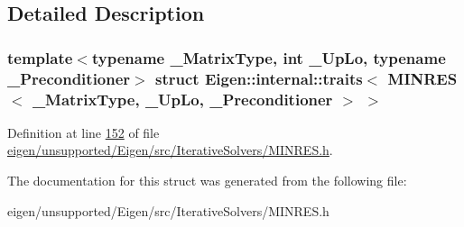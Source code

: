 \subsection{Detailed Description}
\subsubsection*{template$<$typename \+\_\+\+Matrix\+Type, int \+\_\+\+Up\+Lo, typename \+\_\+\+Preconditioner$>$\newline
struct Eigen\+::internal\+::traits$<$ M\+I\+N\+R\+E\+S$<$ \+\_\+\+Matrix\+Type, \+\_\+\+Up\+Lo, \+\_\+\+Preconditioner $>$ $>$}



Definition at line \hyperlink{eigen_2unsupported_2_eigen_2src_2_iterative_solvers_2_m_i_n_r_e_s_8h_source_l00152}{152} of file \hyperlink{eigen_2unsupported_2_eigen_2src_2_iterative_solvers_2_m_i_n_r_e_s_8h_source}{eigen/unsupported/\+Eigen/src/\+Iterative\+Solvers/\+M\+I\+N\+R\+E\+S.\+h}.



The documentation for this struct was generated from the following file\+:\begin{DoxyCompactItemize}
\item 
eigen/unsupported/\+Eigen/src/\+Iterative\+Solvers/\+M\+I\+N\+R\+E\+S.\+h\end{DoxyCompactItemize}

